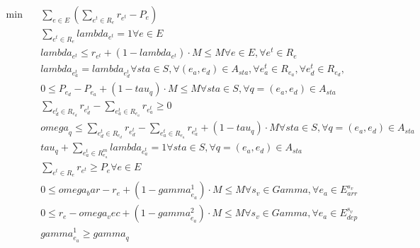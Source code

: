 \begin{align}
  \min\quad & \sum_{e \in E} \left(\sum_{e^{t} \in R_{e}} r_{e^{t}} - P_{e}\right) \tag{eq\_0001} \\
  & \sum_{e^{t} \in R_{e}} \mathit{lambda}_{e^{t}} = 1 \forall e \in E \tag{eq\_0002} \\
  & \mathit{lambda}_{e^{t}} \leq r_{e^{t}} + \left(1 - \mathit{lambda}_{e^{t}}\right) \cdot M \leq M \forall e \in E , \forall e^{t} \in R_{e} \tag{eq\_0003} \\
  & \mathit{lambda}_{e_{a}^{t}} = \mathit{lambda}_{e_{d}^{t}} \forall s t a \in S , \forall \left(e_{a} , e_{d}\right) \in A_{s t a} , \forall e_{a}^{t} \in R_{e_{a}} , \forall e_{d}^{t} \in R_{e_{d}} , \tag{eq\_0004} \\
  & 0 \leq P_{e_{d}} - P_{e_{a}} + \left(1 - \mathit{tau}_{q}\right) \cdot M \leq M \forall s t a \in S , \forall q = \left(e_{a} , e_{d}\right) \in A_{s t a} \tag{eq\_0005} \\
  & \underset{e_{d}^{t} \in R_{e_{d}}}{\sum} r_{e_{d}^{t}} - \underset{e_{a}^{t} \in R_{e_{a}}}{\sum} r_{e_{a}^{t}} \geq 0 \tag{eq\_0006\_a} \\
  & \mathit{omega}_{q} \leq \underset{e_{d}^{t} \in R_{e_{d}}}{\sum} r_{e_{d}^{t}} - \underset{e_{a}^{t} \in R_{e_{a}}}{\sum} r_{e_{a}^{t}} + \left(1 - \mathit{tau}_{q}\right) \cdot M \forall s t a \in S , \forall q = \left(e_{a} , e_{d}\right) \in A_{s t a} \tag{eq\_0006\_b} \\
  & \mathit{tau}_{q} + \underset{e_{a}^{t} \in R_{e_{a}}^{m}}{\sum} \mathit{lambda}_{e_{a}^{t}} = 1 \forall s t a \in S , \forall q = \left(e_{a} , e_{d}\right) \in A_{s t a} \tag{eq\_0007} \\
  & \sum_{e^{t} \in R_{e}} r_{e^{t}} \geq P_{e} \forall e \in E \tag{eq\_0008} \\
  & 0 \leq omega_bar - r_{e} + \left(1 - \mathit{gamma}_{e_{a}}^{1}\right) \cdot M \leq M \forall s_{v} \in \mathit{Gamma} , \forall e_{a} \in E_{a r r}^{s_{v}} \tag{eq\_0009} \\
  & 0 \leq r_{e} - omega_vec + \left(1 - \mathit{gamma}_{e_{a}}^{2}\right) \cdot M \leq M \forall s_{v} \in \mathit{Gamma} , \forall e_{a} \in E_{d e p}^{s_{v}} \tag{eq\_0010} \\
  & \mathit{gamma}_{e_{a}}^{1} \geq \mathit{gamma}_{q} \tag{eq\_0011\_a} \\

\end{align}
